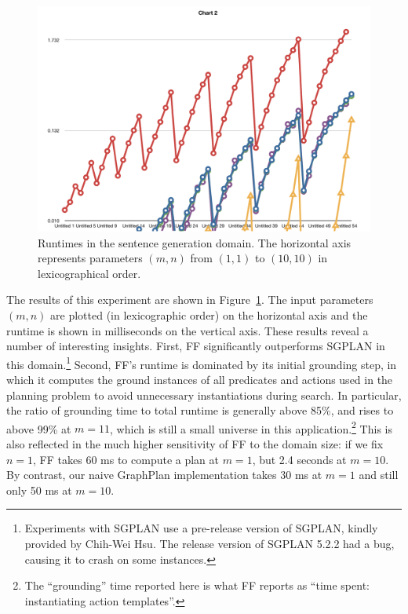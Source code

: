 \begin{figure}
  \centering
  \includegraphics[width=1\columnwidth]{pic-runtime-modifiers-with-sgplan}
  \caption{Runtimes in the sentence generation domain. The horizontal
  axis represents parameters $(m,n)$ from $(1,1)$ to $(10,10)$ in
  lexicographical order.}
  \label{fig:runtimes-crisp}
\end{figure}

The results of this experiment are shown in
Figure~\ref{fig:runtimes-crisp}. The input parameters $(m,n)$ are plotted
(in lexicographic order) on the horizontal axis and the runtime is shown in
milliseconds on the vertical axis. These results reveal a number of
interesting insights. First, FF significantly outperforms
SGPLAN in this domain.\footnote{Experiments with SGPLAN use a
 pre-release version of SGPLAN, kindly provided by Chih-Wei Hsu. The
 release version of SGPLAN 5.2.2 had a bug, causing it to crash on some
 instances.}
Second, FF's runtime is dominated by its initial grounding step, in which
it computes the ground instances of all predicates and actions used in the
planning problem to avoid unnecessary instantiations during search. In
particular, the ratio of grounding time to total runtime is generally above
85\%, and rises to above 99\% at $m=11$, which is still a small universe in
this application.\footnote{The
  ``grounding'' time reported here is what FF reports as ``time spent:
  instantiating action templates''.}  This is also reflected in the
much higher sensitivity of FF to the domain size: if we fix $n=1$, FF takes
60 ms to compute a plan at $m=1$, but 2.4 seconds at $m=10$. By contrast,
our naive GraphPlan implementation takes 30 ms at $m=1$ and still only 50
ms at $m=10$.

